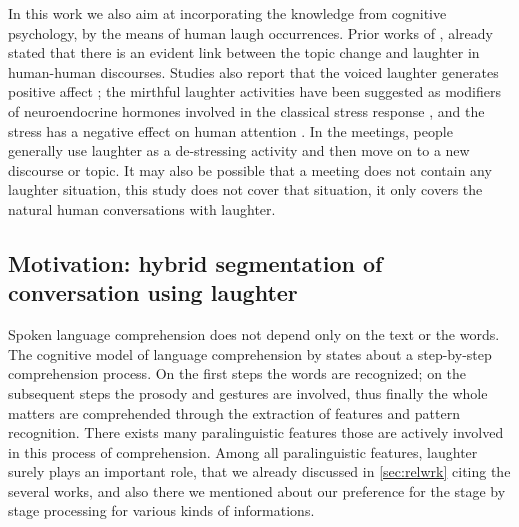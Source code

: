 \documentclass{article}
\begin{document}

In this work we also aim at incorporating the knowledge from cognitive psychology, by the means of human laugh occurrences. Prior works of \cite{holt-10}, \cite{bonin-12} already stated that there is an evident link between the topic change and laughter in human-human discourses. Studies also report that the voiced laughter generates positive affect \cite{bachorowski-01}; the mirthful laughter activities have been suggested as modifiers of neuroendocrine hormones involved in the classical stress response \cite{berk-89}, and the stress has a negative effect on human attention \cite{jensen-98}. In the meetings, people generally use laughter as a de-stressing activity and then move on to a new discourse or topic. It may also be possible that a meeting does not contain any laughter situation, this study does not cover that situation, it only covers the natural human conversations with laughter.

\subsection{Motivation: hybrid segmentation of conversation using laughter}\label{sec:mot}
Spoken language comprehension does not depend only on the text or the words. The cognitive model of language comprehension by \cite{bower-85} states about a step-by-step comprehension process. On the first steps the words are recognized; on the subsequent steps the prosody and gestures are involved, thus finally the whole matters are comprehended through the extraction of features and pattern recognition. There exists many paralinguistic features those are actively involved in this process of comprehension.  Among all paralinguistic features, laughter surely plays an important role, that we already discussed in \ref{sec:relwrk} citing the several works, and also there we mentioned about our preference for the stage by stage processing for various kinds of informations. %
\end{document}
